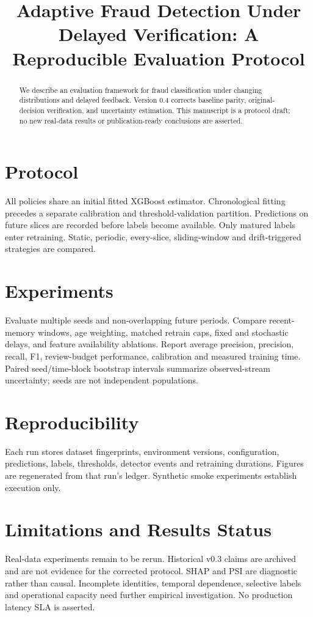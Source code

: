 \documentclass[conference]{IEEEtran}
\title{Adaptive Fraud Detection Under Delayed Verification: A Reproducible Evaluation Protocol}
\author{\IEEEauthorblockN{Sheikh Joynal Abedin Sumon}}
\begin{document}
\maketitle
\begin{abstract}
We describe an evaluation framework for fraud classification under changing distributions
and delayed feedback. Version 0.4 corrects baseline parity, original-decision verification,
and uncertainty estimation. This manuscript is a protocol draft; no new real-data results
or publication-ready conclusions are asserted.
\end{abstract}
\section{Protocol}
All policies share an initial fitted XGBoost estimator. Chronological fitting precedes a
separate calibration and threshold-validation partition. Predictions on future slices
are recorded before labels become available. Only matured labels enter retraining.
Static, periodic, every-slice, sliding-window and drift-triggered strategies are compared.
\section{Experiments}
Evaluate multiple seeds and non-overlapping future periods. Compare recent-memory
windows, age weighting, matched retrain caps, fixed and stochastic delays, and feature
availability ablations. Report average precision, precision, recall, F1, review-budget
performance, calibration and measured training time. Paired seed/time-block bootstrap
intervals summarize observed-stream uncertainty; seeds are not independent populations.
\section{Reproducibility}
Each run stores dataset fingerprints, environment versions, configuration, predictions,
labels, thresholds, detector events and retraining durations. Figures are regenerated
from that run's ledger. Synthetic smoke experiments establish execution only.
\section{Limitations and Results Status}
Real-data experiments remain to be rerun. Historical v0.3 claims are archived and are
not evidence for the corrected protocol. SHAP and PSI are diagnostic rather than causal.
Incomplete identities, temporal dependence, selective labels and operational capacity
need further empirical investigation. No production latency SLA is asserted.
\end{document}
